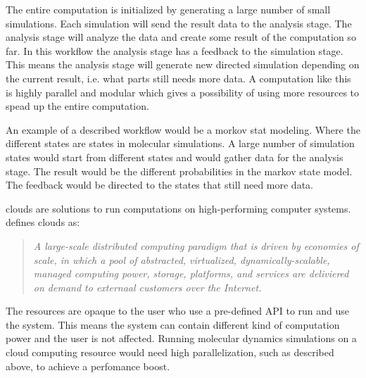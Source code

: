 The entire computation is initialized by generating a large number of
small simulations. Each simulation will send the result data to the
analysis stage. The analysis stage will analyze the data and create
some result of the computation so far. In this workflow the analysis
stage has a feedback to the simulation stage. This means the analysis
stage will generate new directed simulation depending on the current
result, i.e. what parts still needs more data. A computation like this
is highly parallel and modular which gives a possibility of using more
resources to spead up the entire computation.

An example of a described workflow would be a morkov stat
modeling. Where the different states are states in molecular
simulations. A large number of simulation states would start from
different states and would gather data for the analysis stage. The
result would be the different probabilities in the markov state
model. The feedback would be directed to the states that still need
more data.%



clouds are solutions to run computations on high-performing computer
systems. \citet{foster:2008} defines clouds as:

\begin{quote} \slshape
  A large-scale distributed computing paradigm that is driven by
  economies of scale, in which a pool of abstracted, virtualized,
  dynamically-scalable, managed computing power, storage, platforms,
  and services are deliviered on demand to externaal customers over
  the Internet.
\end{quote}

The resources are opaque to the user who use a pre-defined API to run
and use the system. This means the system can contain different kind
of computation power and the user is not affected. Running molecular
dynamics simulations on a cloud computing resource would need high
parallelization, such as described above, to achieve a perfomance
boost.


